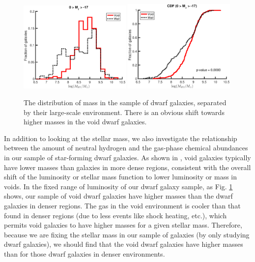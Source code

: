 \begin{figure}
    \centering
    \includegraphics[width=0.49\textwidth]{Images/Paper3/1sig_0-17_I06relations_SF_t3_HI_hist}
    \includegraphics[width=0.49\textwidth]{Images/Paper3/1sig_0-17_I06relations_SF_t3_HI_CDF}
    \caption[ mass distribution]{The distribution of  mass 
    in the sample of dwarf galaxies, separated by their large-scale environment.  
    There is an obvious shift towards higher  masses in the void dwarf 
    galaxies.}
    \label{fig:HI_hist}
\end{figure}

In addition to looking at the stellar mass, we also investigate the relationship 
between the amount of neutral hydrogen and the gas-phase chemical abundances in 
our sample of star-forming dwarf galaxies.  As shown in \cite{Moorman14}, void 
galaxies typically have lower  masses than galaxies in more dense 
regions, consistent with the overall shift of the luminosity or stellar mass 
function to lower luminosity or mass in voids.  In the fixed range of luminosity 
of our dwarf galaxy sample, as Fig. \ref{fig:HI_hist} shows, our sample of void 
dwarf galaxies have higher  masses than the dwarf galaxies in denser 
regions.  The gas in the void environment is cooler than that found in denser 
regions (due to less events like shock heating, etc.), which permits void 
galaxies to have higher  masses for a given stellar mass.  Therefore, 
because we are fixing the stellar mass in our sample of galaxies (by only 
studying dwarf galaxies), we should find that the void dwarf galaxies have 
higher  masses than for those dwarf galaxies in denser environments.

